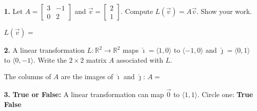 \documentclass[10pt]{article}
\begin{document}
\namedateperiod
\vspace{0.12in}

\begin{notesbox}
\textbf{1.} Let $A = \begin{bmatrix}3&-1\\0&2\end{bmatrix}$ and
$\vec{v}=\begin{bmatrix}2\\1\end{bmatrix}$.
Compute $L(\vec{v})=A\vec{v}$. Show your work.

\vspace{0.06in}

\vspace{0.08in}
$L(\vec{v}) = $ 
\end{notesbox}

\vspace{0.12in}

\begin{notesbox}
\textbf{2.} A linear transformation $L:\mathbb{R}^2\to\mathbb{R}^2$ maps
$\hat{\imath}=\langle1,0\rangle$ to $\langle-1,0\rangle$ and
$\hat{\jmath}=\langle0,1\rangle$ to $\langle0,-1\rangle$.
Write the $2\times2$ matrix $A$ associated with $L$.

\vspace{0.10in}
\hspace{1em}The columns of $A$ are the images of $\hat{\imath}$ and $\hat{\jmath}$:
$A = $ 
\vspace{0.10in}
\end{notesbox}

\vspace{0.12in}

\begin{notesbox}
\textbf{3.} \textbf{True or False:} A linear transformation can map $\vec{0}$
to $\langle1,1\rangle$. Circle one: \quad \textbf{True} \qquad \textbf{False}

\vspace{0.08in}
\end{notesbox}
\end{document}

